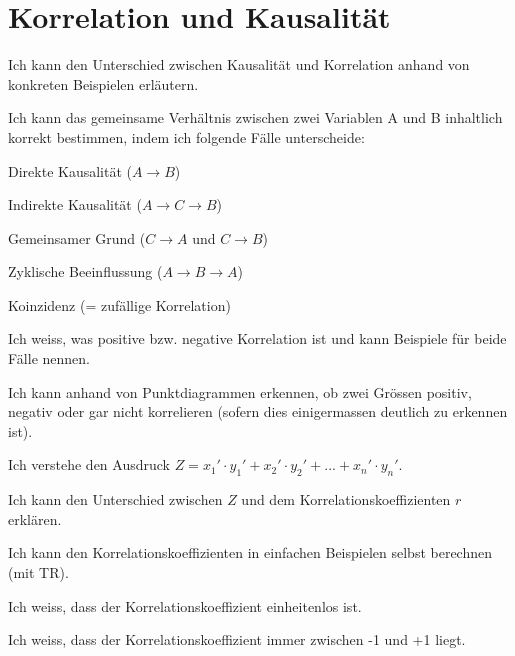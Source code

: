 \section{Korrelation und Kausalität}
\begin{todolist}
    \item Ich kann den Unterschied zwischen Kausalität und Korrelation anhand von konkreten Beispielen erläutern.
    \item Ich kann das gemeinsame Verhältnis zwischen zwei Variablen A und B inhaltlich korrekt bestimmen, indem ich folgende Fälle unterscheide:
    \begin{todolist}
        \item Direkte Kausalität ($A\rightarrow B$)
        \item Indirekte Kausalität ($A\rightarrow C\rightarrow B$)
        \item Gemeinsamer Grund ($C\rightarrow A$ und $C\rightarrow B$)
        \item Zyklische Beeinflussung ($A\rightarrow B \rightarrow A$)
        \item Koinzidenz (= zufällige Korrelation)
    \end{todolist}
    \item Ich weiss, was positive bzw. negative Korrelation ist und kann Beispiele für beide Fälle nennen.
    \item Ich kann anhand von Punktdiagrammen erkennen, ob zwei Grössen positiv,
    negativ oder gar nicht korrelieren (sofern dies einigermassen deutlich zu
    erkennen ist).
    \item Ich verstehe den Ausdruck $Z=x_1'\cdot y_1'+x_2'\cdot y_2'+...+x_n'\cdot y_n'$.
    \item Ich kann den Unterschied zwischen $Z$ und dem Korrelationskoeffizienten $r$ erklären.
    \item Ich kann den Korrelationskoeffizienten in einfachen Beispielen selbst berechnen
    (mit TR).
    \item Ich weiss, dass der Korrelationskoeffizient einheitenlos ist.
    \item Ich weiss, dass der Korrelationskoeffizient immer zwischen -1 und +1 liegt.
\end{todolist}


